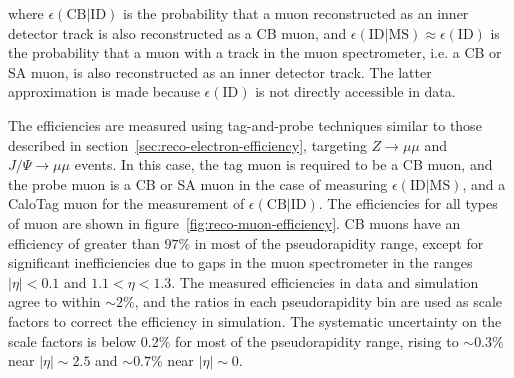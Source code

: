where $\epsilon(\mathrm{CB}|\mathrm{ID})$ is the probability that a muon reconstructed as an inner detector track is also reconstructed as a CB muon, and $\epsilon(\mathrm{ID}|\mathrm{MS})\approx \epsilon(\mathrm{ID})$ is the probability that a muon with a track in the muon spectrometer, i.e. a CB or SA muon, is also reconstructed as an inner detector track. The latter approximation is made because $\epsilon(\mathrm{ID})$ is not directly accessible in data. 

The efficiencies are measured using tag-and-probe techniques similar to those described in section~\ref{sec:reco-electron-efficiency}, targeting $Z\rightarrow\mu\mu$ and $J/\Psi\rightarrow\mu\mu$ events. In this case, the tag muon is required to be a CB muon, and the probe muon is a CB or SA muon in the case of measuring $\epsilon(\mathrm{ID}|\mathrm{MS})$, and a CaloTag muon for the measurement of $\epsilon(\mathrm{CB}|\mathrm{ID})$. The efficiencies for all types of muon are shown in figure~\ref{fig:reco-muon-efficiency}. CB muons have an efficiency of greater than $97\%$ in most of the pseudorapidity range, except for significant inefficiencies due to gaps in the muon spectrometer in the ranges $|\eta|<0.1$ and $1.1<\eta<1.3$. The measured efficiencies in data and simulation agree to within $\sim2\%$, and the ratios in each pseudorapidity bin are used as scale factors to correct the efficiency in simulation. The systematic uncertainty on the scale factors is below $0.2\%$ for most of the pseudorapidity range, rising to $\sim 0.3\%$ near $|\eta|\sim 2.5$ and $\sim0.7\%$ near $|\eta|\sim 0$. 

